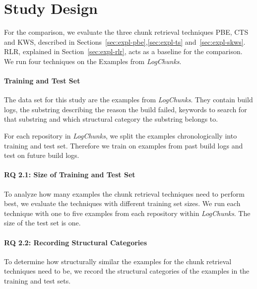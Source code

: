 \documentclass[\myrootdir/main.tex]{subfiles}
\begin{document}
\section{Study Design}
For the comparison, we evaluate the three chunk retrieval techniques PBE, CTS and KWS, described in Sections~\ref{sec:expl-pbe},\ref{sec:expl-ts} and~\ref{sec:expl-skws}.
RLR, explained in Section~\ref{sec:expl-rlr}, acts as a baseline for the comparison.
We run four techniques on the Examples from \emph{LogChunks}.

\paragraph{Training and Test Set}
The data set for this study are the examples from \emph{LogChunks}.
They contain build logs, the substring describing the reason the build failed, keywords to search for that substring and which structural category the substring belongs to.

For each repository in \emph{LogChunks}, we split the examples chronologically into training and test set.
Therefore we train on examples from past build logs and test on future build logs.

\paragraph{RQ 2.1: Size of Training and Test Set}
To analyze how many examples the chunk retrieval techniques need to perform best, we evaluate the techniques with different training set sizes.
We run each technique with one to five examples from each repository within \emph{LogChunks}.
The size of the test set is one.

\paragraph{RQ 2.2: Recording Structural Categories}
To determine how structurally similar the examples for the chunk retrieval techniques need to be, we record the structural categories of the examples in the training and test sets.
\end{document}
